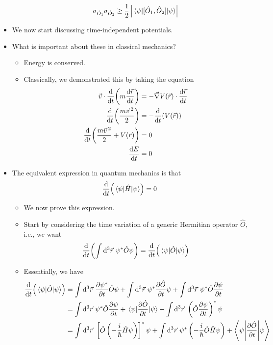 \documentclass[../notes.tex]{subfiles}
\begin{document}
\begin{itemize}
\begin{itemize}
\begin{equation*}
            \sigma_{\hat{O}_1}\sigma_{\hat{O}_2} \geq \frac{1}{2}\left| \ev{[\hat{O}_1,\hat{O}_2]}{\psi} \right|
        \end{equation*}
    \end{itemize}
    \item We now start discussing time-independent potentials.
    \item What is important about these in classical mechanics?
    \begin{itemize}
        \item Energy is conserved.
        \item Classically, we demonstrated this by taking the equation
        \begin{align*}
            \vec{v}\cdot\dv{t}(m\dv{\vec{r}}{t}) &= -\vec{\nabla}V(\vec{r})\cdot\dv{\vec{r}}{t}\\
            \dv{t}(\frac{m\vec{v}{\,}^2}{2}) &= -\dv{t}(V(\vec{r}))\\
            \dv{t}(\frac{m\vec{v}{\,}^2}{2}+V(\vec{r})) &= 0\\
            \dv{E}{t} &= 0
        \end{align*}
    \end{itemize}
    \item The equivalent expression in quantum mechanics is that
    \begin{equation*}
        \dv{t}(\ev{\hat{H}}{\psi}) = 0
    \end{equation*}
    \begin{itemize}
        \item We now prove this expression.
        \item Start by considering the time variation of a generic Hermitian operator $\hat{O}$, i.e., we want
        \begin{equation*}
            \dv{t}(\int\dd^3\vec{r}\ \psi^*\hat{O}\psi) = \dv{t}(\ev{\hat{O}}{\psi})
        \end{equation*}
        \item Essentially, we have
        \begin{align*}
            \dv{t}(\ev{\hat{O}}{\psi}) &= \int\dd^3\vec{r}\ \pdv{\psi^*}{t}\hat{O}\psi+\int\dd^3\vec{r}\ \psi^*\pdv{\hat{O}}{t}\psi+\int\dd^3\vec{r}\ \psi^*\hat{O}\pdv{\psi}{t}\\
            &= \int\dd^3\vec{r}\ \psi^*\hat{O}\pdv{\psi}{t}+\ev{\pdv{\hat{O}}{t}}{\psi}+\int\dd^3\vec{r}\ \left( \hat{O}\pdv{\psi}{t} \right)^*\psi\\
            &= \int\dd^3\vec{r}\ \left[ \hat{O}\left( -\frac{i}{\hbar}\hat{H}\psi \right) \right]^*\psi+\int\dd^3\vec{r}\ \psi^*\left( -\frac{i}{\hbar}\hat{O}\hat{H}\psi \right)+\ev**{\pdv{\hat{O}}{t}}{\psi}\\

\end{align*}
\end{itemize}
\end{itemize}
\end{document}
